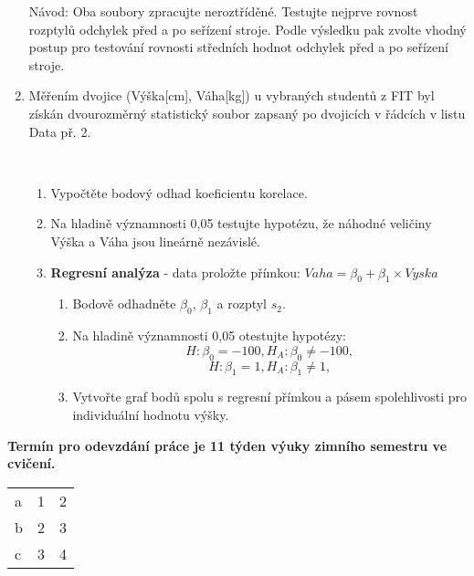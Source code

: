 \documentclass[11pt,titlepage]{article}
\begin{document}
\begin{enumerate}
Návod: Oba soubory zpracujte neroztříděné. Testujte nejprve rovnost rozptylů
odchylek před a po seřízení stroje. Podle výsledku pak zvolte vhodný postup
pro testování rovnosti středních hodnot odchylek před a po seřízení stroje.

\item Měřením dvojice (Výška[cm], Váha[kg]) u vybraných studentů z FIT byl získán
dvourozměrný statistický soubor zapsaný po dvojicích v řádcích v listu
Data př. 2.

\begin{figure}
\\
\end{figure}

\begin{enumerate}
\item Vypočtěte bodový odhad koeficientu korelace.
\item Na hladině významnosti 0,05 testujte hypotézu, že náhodné veličiny Výška a
Váha jsou lineárně nezávislé.
\item \textbf{Regresní analýza} - data proložte přímkou: \(Vaha = \beta_0 + \beta_1 \times Vyska\)
\begin{enumerate}
\item Bodově odhadněte \(\beta_0\), \(\beta_1\) a rozptyl \(s_2\).
\item Na hladině významnosti 0,05 otestujte hypotézy:
\[H : \beta_0 = -100, H_A : \beta_0 \neq -100,\]
\[H : \beta_1 = 1, H_A : \beta_1 \neq 1,\]
\item Vytvořte graf bodů spolu s regresní přímkou a pásem spolehlivosti pro
individuální hodnotu výšky.
\end{enumerate}
\end{enumerate}
\end{enumerate}

\textbf{Termín pro odevzdání práce je 11 týden výuky zimního semestru ve cvičení.}

\begin{center}
\label{tab:orgc05cd70}
\begin{tabular}{lrr}
a & 1 & 2\\
b & 2 & 3\\
c & 3 & 4\\
\end{tabular}
\end{center}
\end{document}
